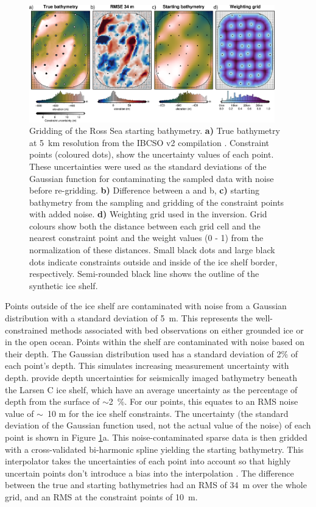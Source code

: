 \begin{figure}[!ht]
    \centering
    \includegraphics[width=0.95\textwidth]{figures/chp3/chp3_Ross_Sea_starting_model_semiregular.png}
    \caption[Ross Sea starting bathymetry]{Gridding of the Ross Sea starting bathymetry. \textbf{a)} True bathymetry at 5~km resolution from the IBCSO v2 compilation \citep{dorschelinternational2022}. Constraint points (coloured dots), show the uncertainty values of each point. These uncertainties were used as the standard deviations of the Gaussian function for contaminating the sampled data with noise before re-gridding. \textbf{b)} Difference between a and b, \textbf{c)} starting bathymetry from the sampling and gridding of the constraint points with added noise. \textbf{d)} Weighting grid used in the inversion. Grid colours show both the distance between each grid cell and the nearest constraint point and the weight values (0 - 1) from the normalization of these distances. Small black dots and large black dots indicate constraints outside and inside of the ice shelf border, respectively. Semi-rounded black line shows the outline of the synthetic ice shelf.}
    \label{fig:chp3_Ross_Sea_starting_model}
\end{figure}

Points outside of the ice shelf are contaminated with noise from a Gaussian distribution with a standard deviation of 5~m. This represents the well-constrained methods associated with bed observations on either grounded ice or in the open ocean. Points within the shelf are contaminated with noise based on their depth. The Gaussian distribution used has a standard deviation of 2\% of each point's depth. This simulates increasing measurement uncertainty with depth. \citet{brisbourneupdated2020} provide depth uncertainties for seismically imaged bathymetry beneath the Larsen C ice shelf, which have an average uncertainty as the percentage of depth from the surface of $\sim$2~\%. For our points, this equates to an RMS noise value of $\sim$~10 m for the ice shelf constraints. The uncertainty (the standard deviation of the Gaussian function used, not the actual value of the noise) of each point is shown in Figure \ref{fig:chp3_Ross_Sea_starting_model}a. This noise-contaminated sparse data is then gridded with a cross-validated bi-harmonic spline yielding the starting bathymetry. This interpolator takes the uncertainties of each point into account so that highly uncertain points don't introduce a bias into the interpolation \citep{uiedaverde2018}. The difference between the true and starting bathymetries had an RMS of 34~m over the whole grid, and an RMS at the constraint points of 10~m.

